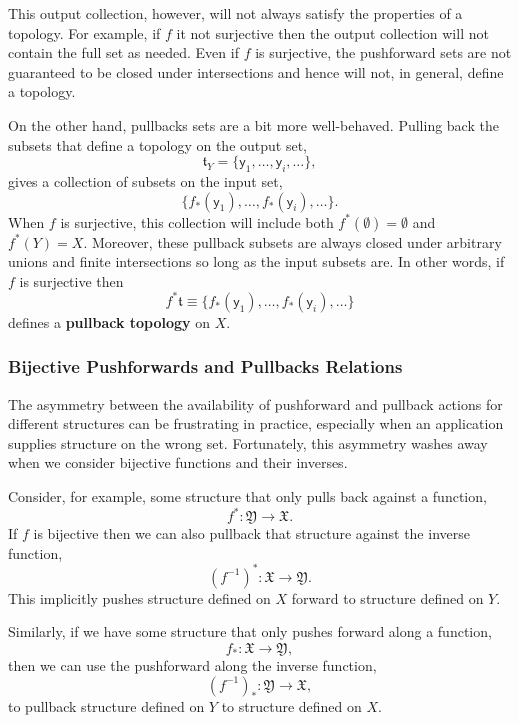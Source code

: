 \documentclass[
  letterpaper,
  DIV=11,
  numbers=noendperiod]{scrartcl}
\begin{document}
This output collection, however, will not always satisfy the properties
of a topology. For example, if \(f\) it not surjective then the output
collection will not contain the full set as needed. Even if \(f\) is
surjective, the pushforward sets are not guaranteed to be closed under
intersections and hence will not, in general, define a topology.

On the other hand, pullbacks sets are a bit more well-behaved. Pulling
back the subsets that define a topology on the output set, \[
\mathfrak{t}_{Y}
=
\{ \mathsf{y}_{1}, \ldots, \mathsf{y}_{i}, \ldots \},
\] gives a collection of subsets on the input set, \[
\{
  f_{*}(\mathsf{y}_{1}), \ldots, f_{*}(\mathsf{y}_{i}), \ldots
  \}.
\] When \(f\) is surjective, this collection will include both
\(f^{*}(\emptyset) = \emptyset\) and \(f^{*}(Y) = X\). Moreover, these
pullback subsets are always closed under arbitrary unions and finite
intersections so long as the input subsets are. In other words, if \(f\)
is surjective then \[
f^{*} \mathfrak{t} \equiv
\{ f_{*}(\mathsf{y}_{1}), \ldots, f_{*}(\mathsf{y}_{i}), \ldots \}
\] defines a \textbf{pullback topology} on \(X\).

\subsubsection{Bijective Pushforwards and Pullbacks
Relations}\label{bijective-pushforwards-and-pullbacks-relations}

The asymmetry between the availability of pushforward and pullback
actions for different structures can be frustrating in practice,
especially when an application supplies structure on the wrong set.
Fortunately, this asymmetry washes away when we consider bijective
functions and their inverses.

Consider, for example, some structure that only pulls back against a
function, \[
f^{*} : \mathfrak{Y} \rightarrow \mathfrak{X}.
\] If \(f\) is bijective then we can also pullback that structure
against the inverse function, \[
(f^{-1})^{*} : \mathfrak{X} \rightarrow \mathfrak{Y}.
\] This implicitly pushes structure defined on \(X\) forward to
structure defined on \(Y\).

Similarly, if we have some structure that only pushes forward along a
function, \[
f_{*} : \mathfrak{X} \rightarrow \mathfrak{Y},
\] then we can use the pushforward along the inverse function, \[
(f^{-1})_{*} : \mathfrak{Y} \rightarrow \mathfrak{X},
\] to pullback structure defined on \(Y\) to structure defined on \(X\).
\end{document}
